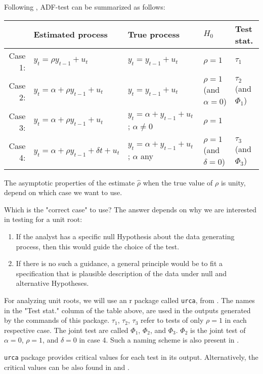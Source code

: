 Following \cite[][see chapter 17]{Hamilton-1994}, ADF-test can be summarized as follows:

\begin{tabular}{r|llll}
     & Estimated process
     & True process
     & $H_0$
     & Test stat.
    \\
    \toprule
    Case 1:
     & $y_t = \rho y_{t-1} + u_t$
     & $y_t = y_{t-1} + u_t$
     & $\rho = 1$
     & $\tau_1$
    \\
    Case 2:
     & $y_t = \alpha + \rho y_{t-1} + u_t$
     & $y_t = y_{t-1} + u_t$
     & $\rho = 1$ (and $\alpha = 0$)
     & $\tau_2$ (and $\Phi_1$)
    \\
    Case 3:
     & $y_t = \alpha + \rho y_{t-1} + u_t$
     & $y_t = \alpha + y_{t-1} + u_t$; $\alpha \neq 0$
     & $\rho = 1$
     &
    \\
    Case 4:
     & $y_t = \alpha + \rho y_{t-1} + \delta t +  u_t$
     & $y_t = \alpha + y_{t-1} + u_t$; $\alpha$ any
     & $\rho = 1$ (and $\delta = 0$)
     & $\tau_3$ (and $\Phi_3$)
\end{tabular}

The asymptotic properties of the \ols{} estimate $\hat\rho$ when the true value of $\rho$ is unity, depend on which case we want to use.

Which is the "correct case" to use? The answer depends on why we are interested in testing for a unit root:
\begin{enumerate}[label=(\arabic*)]
    \item If the analyst has a specific null Hypothesis about the data generating process, then this would guide the choice of the test.

    \item If there is no such a guidance, a general principle would be to fit a specification that is plausible description of the data under null and alternative Hypotheses.
\end{enumerate}

For analyzing unit roots, we will use an r package called \texttt{urca}, from \cite{Pfaff-2008}. The names in the "Test stat." column of the table above, are used in the outputs generated by the commands of this package. $\tau_1$, $\tau_2$, $\tau_3$ refer to tests of only $\rho = 1$ in each respective case. The joint test are called $\Phi_1$, $\Phi_2$, and $\Phi_3$. $\Phi_2$ is the joint test of $\alpha = 0$, $\rho = 1$, and $\delta = 0$ in case 4. Such a naming scheme is also present in \cite[][see Table X on page 1070]{DickeyFuller-1981}.

\texttt{urca} package provides critical values for each test in its output. Alternatively, the critical values can be also found in \cite[][see Appendix B, especially the tables B.6 and B.7]{Hamilton-1994} and \cite[][see page 1063]{DickeyFuller-1981}.
